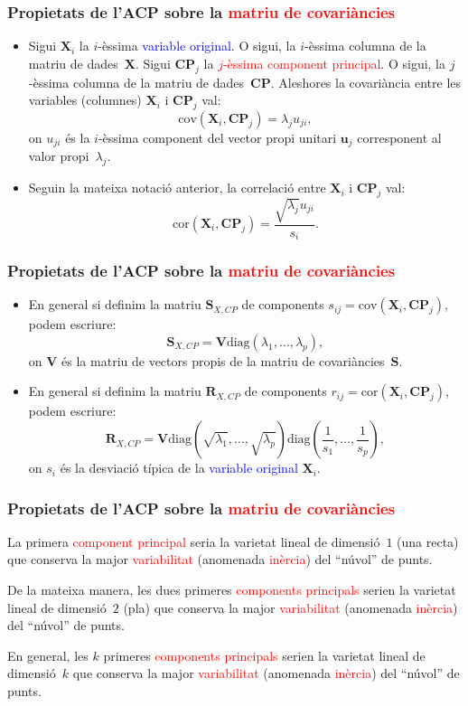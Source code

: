 \documentclass[12pt,t]{beamer}
\newcommand{\red}[1]{\textcolor{red}{#1}}
\newcommand{\blue}[1]{\textcolor{blue}{#1}}
\theoremstyle{plain}
\theoremstyle{definition}
\begin{document}
\begin{frame}
\frametitle{Propietats de l'ACP sobre la \red{matriu de covariàncies}}
{\small
\begin{itemize}
\item Sigui $\mathbf{X}_i$ la $i$-èssima \blue{variable original}. O sigui, la $i$-èssima columna de la matriu de dades~$\mathbf{X}$. Sigui $\mathbf{CP}_j$ la \red{$j$-èssima component principal}. O sigui, la $j$-èssima columna de la matriu de dades~$\mathbf{CP}$. Aleshores la covariància entre les variables (columnes) $\mathbf{X}_i$ i $\mathbf{CP}_j$ val:
\[
\mbox{cov}(\mathbf{X}_i,\mathbf{CP}_j)=\lambda_j u_{ji},
\]
on $u_{ji}$ és la $i$-èssima component del vector propi unitari $\mathbf{u}_j$ corresponent al valor propi~$\lambda_j.$ 

\item Seguin la mateixa notació anterior, la correlació entre $\mathbf{X}_i$ i $\mathbf{CP}_j$ val:
\[
\mbox{cor}(\mathbf{X}_i,\mathbf{CP}_j)=\frac{\sqrt{\lambda_j}u_{ji}}{s_i}.
\]
\end{itemize}
}
\end{frame}

\begin{frame}
\frametitle{Propietats de l'ACP sobre la \red{matriu de covariàncies}}
\begin{itemize}
\item En general si definim la matriu $\mathbf{S}_{X,CP}$ de components $s_{ij}=\mbox{cov}(\mathbf{X}_i,\mathbf{CP}_j)$, podem escriure:
\[
\mathbf{S}_{X,CP}= \mathbf{V}\mbox{diag}(\lambda_1,\ldots,\lambda_p),
\]
on $\mathbf{V}$ és la matriu de vectors propis de la matriu de covariàncies~$\mathbf{S}.$
\item En general si definim la matriu $\mathbf{R}_{X,CP}$ de components $r_{ij}=\mbox{cor}(\mathbf{X}_i,\mathbf{CP}_j)$, podem escriure:
\[
\mathbf{R}_{X,CP}= \mathbf{V}\mbox{diag}(\sqrt{\lambda_1},\ldots,\sqrt{\lambda_p})\mbox{diag}\left(\frac{1}{s_1},\ldots,\frac{1}{s_p}\right),
\]
on $s_i$ és la desviació típica de la \blue{variable original} $\mathbf{X}_i$.
\end{itemize}
\end{frame}

\begin{frame}
\frametitle{Propietats de l'ACP sobre la \red{matriu de covariàncies}}
La primera \red{component principal} seria la varietat lineal de dimensió~$1$ (una recta) que conserva la major \red{variabilitat} (anomenada \red{inèrcia}) del ``núvol'' de punts.
\medskip

De la mateixa manera, les dues primeres \red{components principals} serien la varietat lineal de dimensió~$2$ (pla) que conserva la major \red{variabilitat} (anomenada \red{inèrcia}) del ``núvol'' de punts.
\medskip

En general, les $k$ primeres \red{components principals} serien la varietat lineal de dimensió~$k$ que conserva la major \red{variabilitat} (anomenada \red{inèrcia}) del ``núvol'' de punts.


\end{frame}
\end{document}
